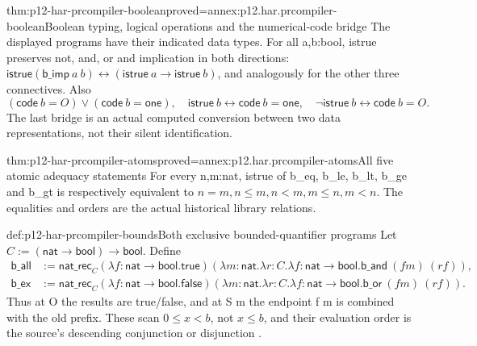 \begin{hblemma}{thm:p12-har-prcompiler-boolean}{proved=annex:p12.har.prcompiler-boolean}{Boolean typing, logical operations and the numerical-code bridge}
The displayed programs have their indicated data types. For all a,b:bool,
istrue preserves not, and, or and implication in both directions:
\(\mathsf{istrue}(\mathsf{b\_imp}\ a\ b)
 \leftrightarrow(\mathsf{istrue}\ a\to\mathsf{istrue}\ b)\),
and analogously for the other three connectives. Also
\[
 (\mathsf{code}\ b=O)\vee(\mathsf{code}\ b=\mathsf{one}),\quad
 \mathsf{istrue}\ b\leftrightarrow\mathsf{code}\ b=\mathsf{one},\quad
 \neg\mathsf{istrue}\ b\leftrightarrow\mathsf{code}\ b=O.
\]
The last bridge is an actual computed conversion between two data
representations, not their silent identification.
\end{hblemma}

\begin{hblemma}{thm:p12-har-prcompiler-atoms}{proved=annex:p12.har.prcompiler-atoms}{All five atomic adequacy statements}
For every n,m:nat, istrue of b\_eq, b\_le, b\_lt, b\_ge and b\_gt
is respectively equivalent to \(n=m,n\le m,n<m,m\le n,m<n\).
The equalities and orders are the actual historical library relations.
\end{hblemma}

\begin{hbdefinition}{def:p12-har-prcompiler-bounds}{Both exclusive bounded-quantifier programs}
Let \(C:=(\mathsf{nat}\to\mathsf{bool})\to\mathsf{bool}\). Define
\[
\begin{aligned}
 \mathsf{b\_all}&:=\mathsf{nat\_rec}_C
    (\lambda f:\mathsf{nat}\to\mathsf{bool}.\mathsf{true})
    (\lambda m:\mathsf{nat}.\lambda r:C.
     \lambda f:\mathsf{nat}\to\mathsf{bool}.
                         \mathsf{b\_and}\ (f m)\ (r f)),\\
 \mathsf{b\_ex}&:=\mathsf{nat\_rec}_C
    (\lambda f:\mathsf{nat}\to\mathsf{bool}.\mathsf{false})
    (\lambda m:\mathsf{nat}.\lambda r:C.
     \lambda f:\mathsf{nat}\to\mathsf{bool}.
                         \mathsf{b\_or}\ (f m)\ (r f)).
\end{aligned}
\]
Thus at O the results are true/false, and at S m the endpoint f m is
combined with the old prefix. These scan \(0\le x<b\), not \(x\le b\),
and their evaluation order is the source's descending conjunction or
disjunction \cite[Definitions~15--16, p.~22]{OostdijkGeuvers2000ProofByComputationPreprint}.
\end{hbdefinition}

